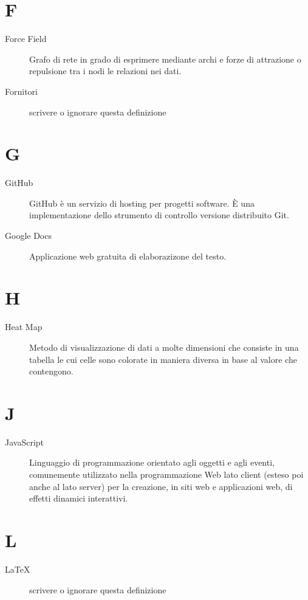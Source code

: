 \documentclass{article}
\begin{document}
\section{F}
\begin{description}
  \item[Force Field] Grafo di rete in grado di esprimere mediante archi e forze di attrazione o repulsione tra i nodi le relazioni nei dati. 
  \item[Fornitori] {scrivere o ignorare questa definizione}
\end{description}
\newpage
\section{G}
\begin{description}
  \item[GitHub] GitHub è un servizio di hosting per progetti software. È una implementazione dello strumento di controllo versione distribuito Git.
  \item[Google Docs] Applicazione web gratuita di elaborazizone del testo.
\end{description}
\newpage
\section{H}
\begin{description}
  \item[Heat Map] Metodo di visualizzazione di dati a molte dimensioni che consiste in una tabella le cui celle sono colorate in maniera diversa in base al valore che contengono.
\end{description}
\newpage
\section{J}
\begin{description}
  \item[JavaScript] Linguaggio di programmazione orientato agli oggetti e agli eventi, comunemente utilizzato nella programmazione Web lato client (esteso poi anche al lato server) per la creazione, in siti web e applicazioni web, di effetti dinamici interattivi.
\end{description}
\newpage
\section{L}
\begin{description}
  \item[LaTeX] {scrivere o ignorare questa definizione}
\end{description}
\newpage
\end{document}
